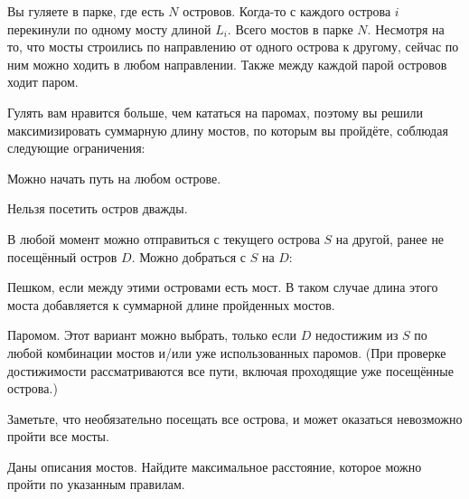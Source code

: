Вы гуляете в парке, где есть $N$ островов. Когда-то с каждого острова $i$
перекинули по одному мосту длиной $L_i$. Всего мостов в парке $N$. Несмотря
на то, что мосты строились по направлению от одного острова к другому, сейчас
по ним можно ходить в любом направлении. Также между каждой парой островов
ходит паром.

Гулять вам нравится больше, чем кататься на паромах, поэтому вы решили
максимизировать суммарную длину мостов, по которым вы пройдёте, соблюдая
следующие ограничения:

\begin{shortitems}
  \item Можно начать путь на любом острове.
  \item Нельзя посетить остров дважды.
  \item В любой момент можно отправиться с текущего острова $S$ на другой,
    ранее не посещённый остров $D$. Можно добраться с $S$ на $D$:

    \begin{shortitems}
      \item Пешком, если между этими островами есть мост. В таком случае
        длина этого моста добавляется к суммарной длине пройденных мостов.
      \item Паромом. Этот вариант можно выбрать, только если $D$ недостижим
        из $S$ по любой комбинации мостов и/или уже использованных паромов.
        (При проверке достижимости рассматриваются все пути, включая
        проходящие уже посещённые острова.)
    \end{shortitems}
\end{shortitems}

Заметьте, что необязательно посещать все острова, и может оказаться невозможно
пройти все мосты.

Даны описания мостов. Найдите максимальное расстояние, которое можно пройти
по указанным правилам.
